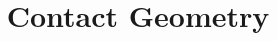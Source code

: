 \documentclass{article}
\begin{document}
\title {Contact Geometry}
\maketitle

\vspace{.5pc}
\vspace{2pc}
\end{document}
